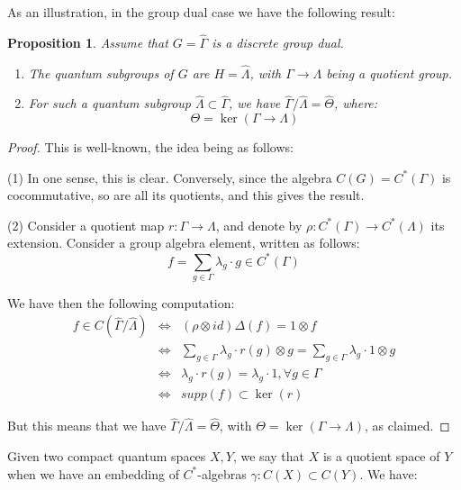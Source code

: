 \documentclass[12pt]{amsbook}
\newtheorem{proposition}[theorem]{Proposition}
\begin{document}
As an illustration, in the group dual case we have the following result:

\begin{proposition}
Assume that $G=\widehat{\Gamma}$ is a discrete group dual.
\begin{enumerate}
\item The quantum subgroups of $G$ are $H=\widehat{\Lambda}$, with $\Gamma\to\Lambda$ being a quotient group.

\item For such a quantum subgroup $\widehat{\Lambda}\subset\widehat{\Gamma}$, we have $\widehat{\Gamma}/\widehat{\Lambda}=\widehat{\Theta}$, where:
$$\Theta=\ker(\Gamma\to\Lambda)$$
\end{enumerate}
\end{proposition}

\begin{proof}
This is well-known, the idea being as follows:

\medskip

(1) In one sense, this is clear. Conversely, since the algebra $C(G)=C^*(\Gamma)$ is cocommutative, so are all its quotients, and this gives the result.

\medskip

(2) Consider a quotient map $r:\Gamma\to\Lambda$, and denote by $\rho:C^*(\Gamma)\to C^*(\Lambda)$ its extension. Consider a group algebra element, written as follows:
$$f=\sum_{g\in\Gamma}\lambda_g\cdot g\in C^*(\Gamma)$$

We have then the following computation:
\begin{eqnarray*}
f\in C(\widehat{\Gamma}/\widehat{\Lambda})
&\iff&(\rho\otimes id)\Delta(f)=1\otimes f\\
&\iff&\sum_{g\in\Gamma}\lambda_g\cdot r(g)\otimes g=\sum_{g\in\Gamma}\lambda_g\cdot 1\otimes g\\
&\iff&\lambda_g\cdot r(g)=\lambda_g\cdot 1,\forall g\in\Gamma\\
&\iff&supp(f)\subset\ker(r)
\end{eqnarray*}

But this means that we have $\widehat{\Gamma}/\widehat{\Lambda}=\widehat{\Theta}$, with $\Theta=\ker(\Gamma\to\Lambda)$, as claimed.
\end{proof}

Given two compact quantum spaces $X,Y$, we say that $X$ is a quotient space of $Y$ when we have an embedding of $C^*$-algebras $\gamma:C(X)\subset C(Y)$. We have:

\end{document}
